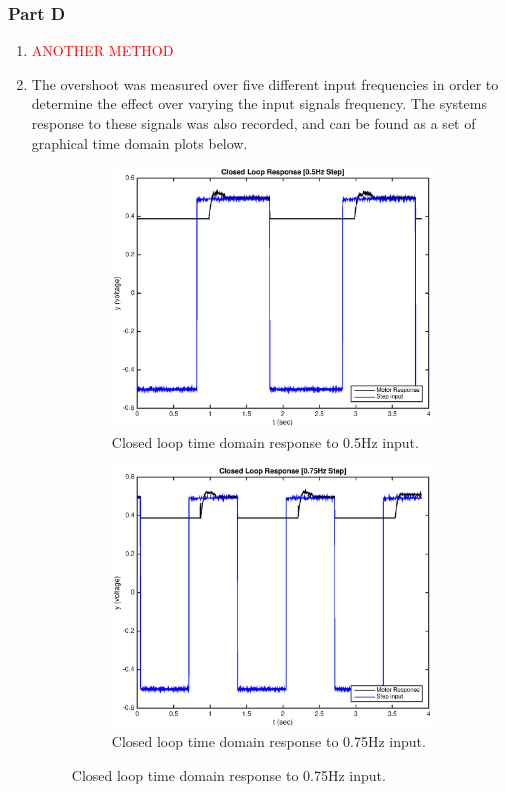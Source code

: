 \documentclass[11pt,a4paper]{article}
\begin{document}
\pagebreak
\subsubsection{Part D}
\label{sec:d}
\begin{enumerate}
	\item \textcolor{red}{ANOTHER METHOD}
	
	
	
	
	
	\item The overshoot was measured over five different input frequencies in order to determine the effect over varying the input signals frequency. The systems response to these signals was also recorded, and can be found as a set of graphical time domain plots below.
	\begin{figure}[H]
	  \begin{subfigure}{0.5\textwidth}
	  \includegraphics[width=0.9\linewidth]{Matlab_Code/Figures/D2_0_5Hz.eps} 
	  \caption{Closed loop time domain response to 0.5Hz input.}
	  \label{fig:subim1}
	  \end{subfigure}
	  \begin{subfigure}{0.5\textwidth}
	  \includegraphics[width=0.9\linewidth]{Matlab_Code/Figures/D2_0_75Hz.eps}
	  \caption{Closed loop time domain response to 0.75Hz input.}
	  \label{fig:subim2}
	  \end{subfigure}
	  

\end{figure}
\end{enumerate}
\end{document}

